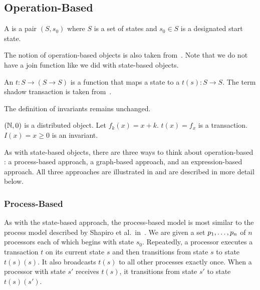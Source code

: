 \subsection{Operation-Based}
\begin{definition}
  A  is a pair $(S, s_0)$
  where $S$ is a set of states and $s_0 \in S$ is a designated start state.
\end{definition}

The notion of operation-based objects is also taken
from~\cite{shapiro2011conflict}. Note that we do not have a join function like
we did with state-based objects.

\begin{definition}
  An  $t: S \to (S \to S)$ is a function
  that maps a state to a  $t(s): S \to S$. The term
  shadow transaction is taken from~\cite{li2014automating}.
\end{definition}

The definition of invariants remains unchanged.

\begin{example}
  $(\mathbb{N}, 0)$ is a distributed object. Let $f_k(x) = x + k$. $t(x) = f_x$ is a
  transaction. $I(x) = x \geq 0$ is an invariant.
\end{example}

As with state-based objects, there are three ways to think about
operation-based \Iconfluence{}: a process-based approach, a graph-based
approach, and an expression-based approach. All three approaches are
illustrated in  and are described in more detail below.



\subsubsection{Process-Based}
As with the state-based approach, the process-based model is most similar to
the process model described by Shapiro et al.\ in~\cite{shapiro2011conflict}.
We are given a set ${p}_{1}, \ldots, {p}_{n}$ of $n$ processors each of which begins with
state $s_0$. Repeatedly, a processor executes a transaction $t$ on its current
state $s$ and then transitions from state $s$ to state $t(s)(s)$. It also
broadcasts $t(s)$ to all other processes exactly once. When a processor with
state $s'$ receives $t(s)$, it transitions from state $s'$ to state $t(s)(s')$.

